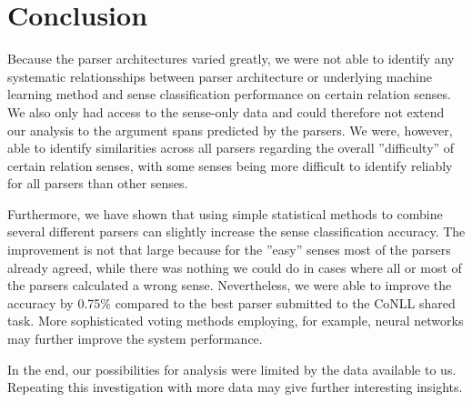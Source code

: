\documentclass[10pt,notitlepage]{scrartcl}
\begin{document}
\section*{Conclusion}
Because the parser architectures varied greatly, we were not able to identify any systematic relationsships between parser architecture or underlying machine learning method and sense classification performance on certain relation senses. We also only had access to the sense-only data and could therefore not extend our analysis to the argument spans predicted by the parsers. We were, however, able to identify similarities across all parsers regarding the overall ''difficulty'' of certain relation senses, with some senses being more difficult to identify reliably for all parsers than other senses.

Furthermore, we have shown that using simple statistical methods to combine several different parsers can slightly increase the sense classification accuracy. The improvement is not that large because for the ''easy'' senses most of the parsers already agreed, while there was nothing we could do in cases where all or most of the parsers calculated a wrong sense. Nevertheless, we were able to improve the accuracy by 0.75\% compared to the best parser submitted to the CoNLL shared task. More sophisticated voting methods employing, for example, neural networks may further improve the system performance.

In the end, our possibilities for analysis were limited by the data available to us. Repeating this investigation with more data may give further interesting insights.
\pagebreak


\end{document}
